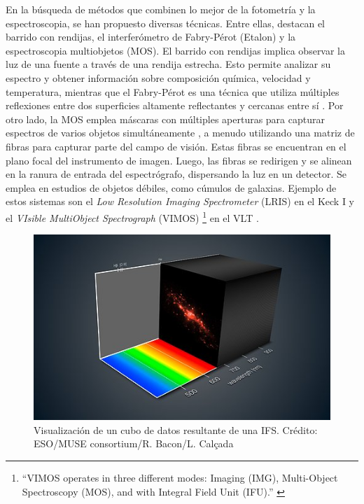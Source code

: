 \documentclass[10pt,twocolumn,a4paper]{opticajnl}
\begin{document}
En la búsqueda de métodos que combinen lo mejor de la fotometría y la espectroscopia, se han propuesto diversas técnicas. Entre ellas, destacan el barrido con rendijas, el interferómetro de Fabry-Pérot (Etalon) y la espectroscopia multiobjetos (MOS). El barrido con rendijas implica observar la luz de una fuente a través de una rendija estrecha. Esto permite analizar su espectro y obtener información sobre composición química, velocidad y temperatura, mientras que el Fabry-Pérot es una técnica que utiliza múltiples reflexiones entre dos superficies altamente reflectantes y cercanas entre sí \cite{olmo-nave}. Por otro lado, la MOS emplea máscaras con múltiples aperturas para capturar espectros de varios objetos simultáneamente \cite{oconnell_astr511}, a menudo utilizando una matriz de fibras para capturar parte del campo de visión. Estas fibras se encuentran en el plano focal del instrumento de imagen. Luego, las fibras se redirigen y se alinean en la ranura de entrada del espectrógrafo, dispersando la luz en un detector. Se emplea en estudios de objetos débiles, como cúmulos de galaxias. Ejemplo de estos sistemas son el \textit{Low Resolution Imaging Spectrometer} (LRIS) en el Keck I y el \textit{VIsible MultiObject Spectrograph} (VIMOS) \footnote{“VIMOS operates in three different modes: Imaging (IMG), Multi-Object Spectroscopy (MOS), and with Integral Field Unit (IFU).” \cite{eso_vimos}} en el VLT \cite{oke_1995}.

\begin{figure}
    \centering
    \includegraphics[width=0.8\linewidth]{ifus.jpg}
    \caption{Visualización de un cubo de datos resultante de una IFS. Crédito: ESO/MUSE consortium/R. Bacon/L. Calçada}
    \label{fig:ifus}
\end{figure}
\end{document}
